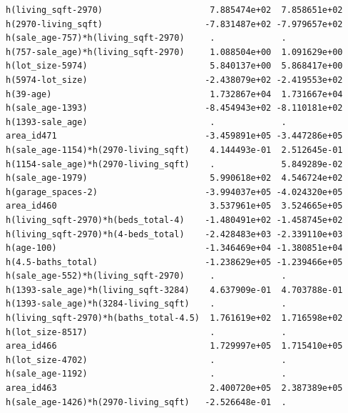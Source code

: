 \documentclass[
]{article}
\begin{document}
\begin{verbatim}
h(living_sqft-2970)                     7.885474e+02  7.858651e+02
h(2970-living_sqft)                    -7.831487e+02 -7.979657e+02
h(sale_age-757)*h(living_sqft-2970)     .             .           
h(757-sale_age)*h(living_sqft-2970)     1.088504e+00  1.091629e+00
h(lot_size-5974)                        5.840137e+00  5.868417e+00
h(5974-lot_size)                       -2.438079e+02 -2.419553e+02
h(39-age)                               1.732867e+04  1.731667e+04
h(sale_age-1393)                       -8.454943e+02 -8.110181e+02
h(1393-sale_age)                        .             .           
area_id471                             -3.459891e+05 -3.447286e+05
h(sale_age-1154)*h(2970-living_sqft)    4.144493e-01  2.512645e-01
h(1154-sale_age)*h(2970-living_sqft)    .             5.849289e-02
h(sale_age-1979)                        5.990618e+02  4.546724e+02
h(garage_spaces-2)                     -3.994037e+05 -4.024320e+05
area_id460                              3.537961e+05  3.524665e+05
h(living_sqft-2970)*h(beds_total-4)    -1.480491e+02 -1.458745e+02
h(living_sqft-2970)*h(4-beds_total)    -2.428483e+03 -2.339110e+03
h(age-100)                             -1.346469e+04 -1.380851e+04
h(4.5-baths_total)                     -1.238629e+05 -1.239466e+05
h(sale_age-552)*h(living_sqft-2970)     .             .           
h(1393-sale_age)*h(living_sqft-3284)    4.637909e-01  4.703788e-01
h(1393-sale_age)*h(3284-living_sqft)    .             .           
h(living_sqft-2970)*h(baths_total-4.5)  1.761619e+02  1.716598e+02
h(lot_size-8517)                        .             .           
area_id466                              1.729997e+05  1.715410e+05
h(lot_size-4702)                        .             .           
h(sale_age-1192)                        .             .           
area_id463                              2.400720e+05  2.387389e+05
h(sale_age-1426)*h(2970-living_sqft)   -2.526648e-01  .           
                                                                  

\end{verbatim}
\end{document}
